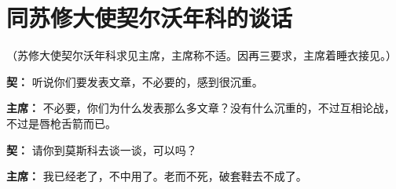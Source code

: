 \section[同苏修大使契尔沃年科的谈话（一九六三年二月二十三日）]{同苏修大使契尔沃年科的谈话}


（苏修大使契尔沃年科求见主席，主席称不适。因再三要求，主席着睡衣接见。）
\begin{duihua}
\item[\textbf{契：}] 听说你们要发表文章，不必要的，感到很沉重。

\item[\textbf{主席：}] 不必要，你们为什么发表那么多文章？没有什么沉重的，不过互相论战，不过是唇枪舌箭而已。

\item[\textbf{契：}] 请你到莫斯科去谈一谈，可以吗？

\item[\textbf{主席：}] 我已经老了，不中用了。老而不死，破套鞋去不成了。
\end{duihua}

